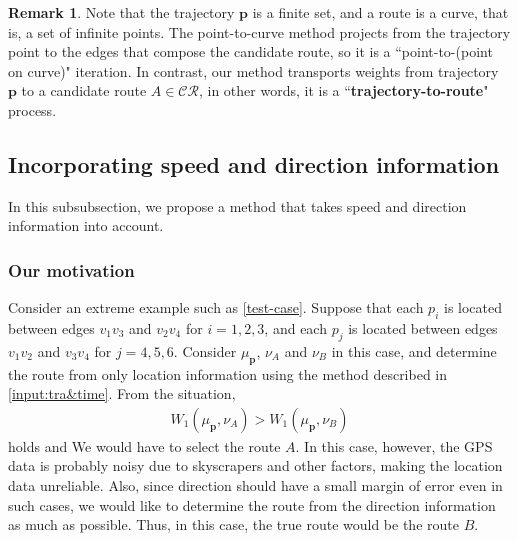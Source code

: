 \documentclass{article}
\numberwithin{equation}{section}
\theoremstyle{definition}
\newtheorem{remark}[remark]{Remark}
\newcommand{\CR}{\mathcal{CR}}
\begin{document}
\begin{remark}
Note that the trajectory $\mathbf{p}$ is a finite set, and a route is a curve, that is, a set of infinite points.
The point-to-curve method projects from the trajectory point to the edges that compose the candidate route, so it is a ``point-to-(point on curve)" iteration.
In contrast, our method transports weights from trajectory $\mathbf{p}$ to a candidate route $A\in\CR$, in other words, it is a ``\textbf{trajectory-to-route}" process.
\end{remark}

\subsection{Incorporating speed and direction information} \label{S&D}

In this subsubsection, we propose a method that takes speed and direction information into account.

\subsubsection{Our motivation}

Consider an extreme example such as \autoref{test-case}.
Suppose that each $p_i$ is located between edges $v_1v_3$ and $v_2v_4$ for $i=1,2,3$, and each $p_j$ is located between edges $v_1v_2$ and $v_3v_4$ for $j=4,5,6$.
Consider $\mu_\mathbf{p}$, $\nu_A$ and $\nu_B$ in this case, and determine the route from only location information using the method described in \autoref{input:tra&time}.
From the situation, 
\begin{align}
W_1(\mu_\mathbf{p},\nu_A) > W_1(\mu_\mathbf{p},\nu_B) \label{eq:only lacation}
\end{align}
holds and We would have to select the route $A$.
In this case, however, the GPS data is probably noisy due to skyscrapers and other factors, making the location data unreliable.
Also, since direction should have a small margin of error even in such cases, we would like to determine the route from the direction information as much as possible.
Thus, in this case, the true route would be the route $B$.
\end{document}
